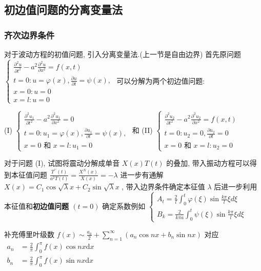 \documentclass[10pt]{yerbaformat}
\begin{document}
\subsection{初边值问题的分离变量法}
\subsubsection{齐次边界条件}
\par 对于波动方程的初值问题, 引入分离变量法.(上一节是自由边界) 首先原问题 $\left\{\begin{array}{l}\frac{\partial^{2} u}{\partial t^{2}}-a^{2} \frac{\partial^{2} u}{\partial x^{2}}=f(x, t) \\ t=0: u=\varphi(x), \frac{\partial u}{\partial t}=\psi(x), \\ x=0: u=0 \\ x=l: u=0\end{array}\right.$ 可以分解为两个初边值问题:

(I) $\left\{\begin{array}{l}\frac{\partial^{2} u_{1}}{\partial t^{2}}-a^{2} \frac{\partial^{2} u_{1}}{\partial x^{2}}=0 \\ t=0: u_{1}=\varphi(x), \frac{\partial u_{1}}{\partial t}=\psi(x), \\ x=0 \text { 和 } x=l: u_{1}=0\end{array}\right.$
和 (II) $\left\{\begin{array}{l}\frac{\partial^{2} u_{2}}{\partial t^{2}}-a^{2} \frac{\partial^{2} u_{2}}{\partial x^{2}}=f(x, t) \\ t=0: u_{2}=0, \frac{\partial u_{2}}{\partial t}=0 \\ x=0 \text { 和 } x=l: u_{2}=0\end{array}\right.$

\par 对于问题 (I), 试图将震动分解成单音 $X(x) T(t)$ 的叠加, 带入振动方程可以得到本征值问题 $\frac{T^{\prime \prime}(t)}{a^{2} T(t)}=\frac{X^{N}(x)}{X(x)}=-\lambda$
进一步有通解 $X(x)=C_{1} \cos \sqrt{\lambda} x+C_{2} \sin \sqrt{\lambda} x$ , 带入边界条件确定本征值 $\lambda$ 后进一步利用本征值和\textbf{初边值问题 $(t=0)$ }确定系数例如 $\left\{\begin{array}{l}A_{t}=\frac{2}{l} \int_{0}^{t} \varphi(\xi) \sin \frac{k \pi}{l} \xi d \xi \\ B_{k}=\frac{2}{k \pi a} \int_{0}^{t} \psi(\xi) \sin \frac{k \pi}{l} \xi d \xi\end{array}\right.$

\par 补充傅里叶级数 $f(x) \sim \frac{a_{0}}{2}+\sum_{n=1}^{\infty}\left(a_{n} \cos n x+b_{n} \sin n x\right)$ 对应 $\begin{aligned} a_{n} &=\frac{2}{\pi} \int_{0}^{\pi} f(x) \cos n x \mathrm{d} x \\ b_{n} &=\frac{2}{\pi} \int_{0}^{\pi} f(x) \sin n x \mathrm{d} x \end{aligned}$
\end{document}
